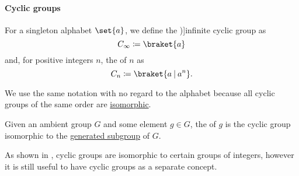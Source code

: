 \paragraph{Cyclic groups}

\begin{definition}\label{def:cyclic_group}
  For a singleton alphabet \( \set{ a } \), we define the \term[ru=(бесконечная) циклическая группа (\cite[sec. 2.11]{Тыртышников2007})]{infinite cyclic group} as
  \begin{equation}\label{def:cyclic_group/infinite}
    C_\infty \coloneqq \braket{ a }
  \end{equation}
  and, for positive integers \( n \), the  of  \( n \) as
  \begin{equation}\label{def:cyclic_group/finite}
    C_n \coloneqq \braket{ a \given a^n }.
  \end{equation}

  We use the same notation with no regard to the alphabet because all cyclic groups of the same order are \hyperref[def:group/homomorphism]{isomorphic}.
\end{definition}
\begin{comments}
  \item Given an ambient group \( G \) and some element \( g \in G \), the  of \( g \) is the cyclic group isomorphic to the \hyperref[def:group/submodel]{generated subgroup} of \( G \).

  \item As shown in , cyclic groups are isomorphic to certain groups of integers, however it is still useful to have cyclic groups as a separate concept.
\end{comments}

